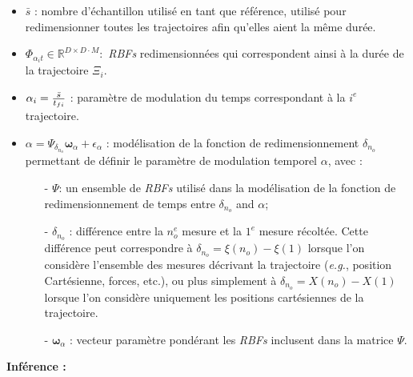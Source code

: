 \documentclass[utf8]{frontiersSCNS} %
\begin{document}
\begin{itemize}
\item $\bar{s}$ : nombre d'échantillon utilisé en tant que référence, utilisé pour redimensionner toutes les trajectoires afin qu'elles aient la même durée.
\item $\Phi_{\alpha_i t} \in \mathbb{R}^{D\times D \cdot M} :$ \textit{RBFs} redimensionnées qui correspondent ainsi à la durée de la trajectoire $\Xi_i$.
\item $\alpha_i = { \bar{s} \over t_{fi}}$ : paramètre de modulation du temps correspondant à la $i^e$ trajectoire.
\item $\alpha = \Psi_{\delta_{n_o}}\boldsymbol{\omega}_\alpha + \epsilon_\alpha$ : modélisation de la fonction de redimensionnement $\delta_{n_o}$ permettant de définir le paramètre de modulation temporel $\alpha$, avec :

\begin{itemize}
\item[-] $\Psi$: un ensemble de \textit{\textit{RBFs}} utilisé dans la modélisation de la fonction de redimensionnement de temps entre $\delta_{n_o}$ and $\alpha$;
\item[-] $\delta_{n_o}$ : différence entre la $n_o^e$ mesure et la $1^e$ mesure récoltée. Cette différence peut correspondre à $\delta_{n_o}=\xi(n_o) - \xi(1)$ lorsque l'on considère l'ensemble des mesures décrivant la trajectoire (\textit{e.g.}, position Cartésienne, forces, etc.), ou plus simplement à $\delta_{n_o}= X(n_o) - X(1)$ lorsque l'on considère uniquement les positions cartésiennes de la trajectoire.
\item[-] $\boldsymbol{\omega}_\alpha$ : vecteur paramètre pondérant les \textit{RBFs} inclusent dans la matrice $\Psi$. 

\end{itemize}
\end{itemize}
\textbf{Inférence :}
\end{document}
